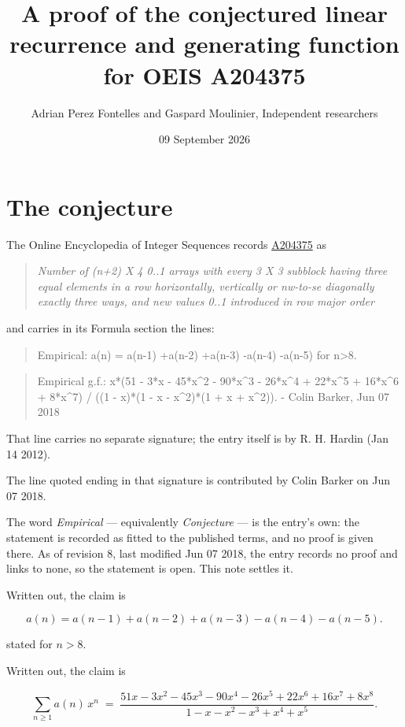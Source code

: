 \documentclass[11pt]{article}
\title{A proof of the conjectured linear recurrence and generating function for OEIS A204375}
\author{Adrian Perez Fontelles and Gaspard Moulinier, Independent researchers}
\date{09 September 2026}
\theoremstyle{definition}
\begin{document}
\maketitle
\section{The conjecture}

The Online Encyclopedia of Integer Sequences records \href{https://oeis.org/A204375}{A204375} as

\begin{quote}\itshape Number of (n+2) X 4 0..1 arrays with every 3 X 3 subblock having three equal elements in a row horizontally, vertically or nw-to-se diagonally exactly three ways, and new values 0..1 introduced in row major order\end{quote}

and carries in its Formula section the lines:

\begin{quote}\ttfamily Empirical: a(n) = a(n-1) +a(n-2) +a(n-3) -a(n-4) -a(n-5) for n>8.\end{quote}

\begin{quote}\ttfamily Empirical g.f.: x*(51 - 3*x - 45*x\textasciicircum{}2 - 90*x\textasciicircum{}3 - 26*x\textasciicircum{}4 + 22*x\textasciicircum{}5 + 16*x\textasciicircum{}6 + 8*x\textasciicircum{}7) / ((1 - x)*(1 - x - x\textasciicircum{}2)*(1 + x + x\textasciicircum{}2)). - Colin Barker, Jun 07 2018\end{quote}

That line carries no separate signature; the entry itself is by R. H. Hardin (Jan 14 2012).

The line quoted ending in that signature is contributed by Colin Barker on Jun 07 2018.

The word {\itshape Empirical} --- equivalently {\itshape Conjecture} --- is the entry's own: the statement is recorded as fitted to the published terms, and no proof is given there. As of revision 8, last modified Jun 07 2018, the entry records no proof and links to none, so the statement is open. This note settles it.

Written out, the claim is

\[a(n) = a(n-1) + a(n-2) + a(n-3) - a(n-4) - a(n-5).\]

stated for $n > 8$.

Written out, the claim is

\[\sum_{n \ge 1} a(n)\,x^n \;=\; \frac{51x - 3x^{2} - 45x^{3} - 90x^{4} - 26x^{5} + 22x^{6} + 16x^{7} + 8x^{8}}{1 - x - x^{2} - x^{3} + x^{4} + x^{5}}.\]
\end{document}
